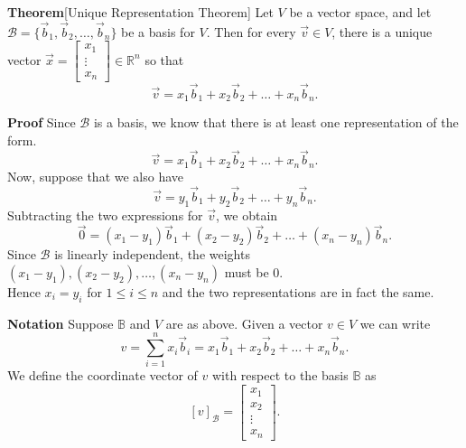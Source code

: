  \begin{frame}[fragile]
\textbf{Theorem}[Unique Representation Theorem]
Let $V$ be a vector space, and let  
${\mathcal B} = \{ \vec{b}_1, \vec{b}_2,\dots , \vec{b}_n\}$
be a basis for $V$.  Then for every $\vec{v} \in V$, there is a unique vector
$\vec{x} = \left[\begin{array}{rrrrrr} x_1 \\ \vdots \\ x_n \end{array} \right]  \in \mathbb R^n$ so that 
\[
\vec{v} = x_1 \vec{b}_1 + x_2 \vec{b}_2 + \dots + x_n \vec{b}_n.
\]

\end{frame}





 \begin{frame}[fragile]
\textbf{Proof}
Since $\mathcal B$ is a basis, we know that there is at least one 
representation of the form.    
\[
\vec{v} = x_1 \vec{b}_1 + x_2 \vec{b}_2 + \dots + x_n \vec{b}_n.
\]
Now, suppose that we also have 
\[
\vec{v} = y_1 \vec{b}_1 + y_2 \vec{b}_2 + \dots + y_n \vec{b}_n.
\] 
Subtracting the two expressions for 
$\vec{v}$, we obtain
\[
\vec{0} = 
(x_1-y_1) \vec{b}_1 + (x_2-y_2) \vec{b}_2 + \dots + (x_n-y_n) \vec{b}_n.
\]  
Since $\mathcal B$ is linearly independent, the weights 
$(x_1 - y_1), (x_2-y_2), \dots, (x_n-y_n)$ must be 0.   \\
Hence $x_i = y_i$ for $1\le i\le n$ and the two representations are in fact the same. 

\end{frame}






 \begin{frame}[fragile]
\textbf{Notation}
Suppose $\mathbb B$ and $V$ are as above.  Given a vector
$v \in V$ we can write 
\[
{v} = \sum_{i=1}^n x_i \vec{b}_i = x_1 \vec{b}_1 + 
x_2 \vec{b}_2 + \dots + x_n \vec{b}_n.
\]
We define the coordinate vector of $v$ with respect to the basis $\mathbb B$ as
\[
[{v} ]_{\mathcal B} = \left[\begin{array}{rrrrrr}  x_1 \\ x_2 \\ \vdots \\ x_n \end{array} \right].
\]

\end{frame}






